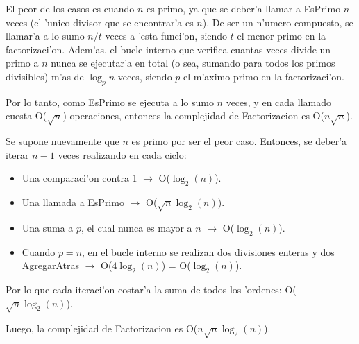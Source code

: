El peor de los casos es cuando $n$ es primo, ya que se deber'a llamar a EsPrimo $n$ veces (el 'unico divisor que se encontrar'a es $n$). De ser un n'umero compuesto, se llamar'a a lo sumo $n/t$ veces a 'esta funci'on, siendo $t$ el menor primo en la factorizaci'on. Adem'as, el bucle interno que verifica cuantas veces divide un primo a $n$ nunca se ejecutar'a en total (o sea, sumando para todos los primos divisibles) m'as de $\log_p{n}$ veces, siendo $p$ el m'aximo primo en la factorizaci'on.

Por lo tanto, como EsPrimo se ejecuta a lo sumo $n$ veces, y en cada llamado cuesta O($\sqrt{n}$) operaciones, entonces la complejidad de Factorizacion es O($n\sqrt{n}$).

\vspace{2em}


Se supone nuevamente que $n$ es primo por ser el peor caso. Entonces, se deber'a iterar $n-1$ veces realizando en cada ciclo:
\begin{itemize}
\item Una comparaci'on contra 1 $\rightarrow$ O($\log_2(n)$).
\item Una llamada a EsPrimo  $\rightarrow$ O($\sqrt{n}\log_2(n)$).
\item Una suma a $p$, el cual nunca es mayor a $n$  $\rightarrow$ O($\log_2(n)$).
\item Cuando $p = n$, en el bucle interno se realizan dos divisiones enteras y dos AgregarAtras  $\rightarrow$ O($4\log_2(n)$) = O($\log_2(n)$).
\end{itemize}

Por lo que cada iteraci'on costar'a la suma de todos los 'ordenes: O($\sqrt{n}\log_2(n)$).

Luego, la complejidad de Factorizacion es O($n\sqrt{n}\log_2(n)$).

\vspace{2em}




